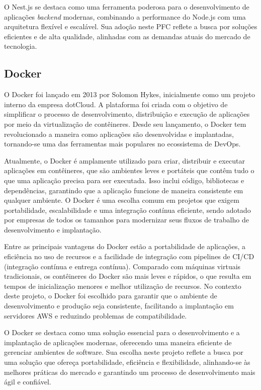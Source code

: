 O Nest.js se destaca como uma ferramenta poderosa para o desenvolvimento de aplicações \textit{backend} modernas, combinando a performance do Node.js com uma arquitetura flexível e escalável. Sua adoção neste \acrlong{PFC} reflete a busca por soluções eficientes e de alta qualidade, alinhadas com as demandas atuais do mercado de tecnologia.

\subsection{Docker}

O Docker foi lançado em 2013 por Solomon Hykes, inicialmente como um projeto interno da empresa dotCloud. A plataforma foi criada com o objetivo de simplificar o processo de desenvolvimento, distribuição e execução de aplicações por meio da virtualização de contêineres. Desde seu lançamento, o Docker tem revolucionado a maneira como aplicações são desenvolvidas e implantadas, tornando-se uma das ferramentas mais populares no ecossistema de DevOps.

Atualmente, o Docker é amplamente utilizado para criar, distribuir e executar aplicações em contêineres, que são ambientes leves e portáteis que contêm tudo o que uma aplicação precisa para ser executada. Isso inclui código, bibliotecas e dependências, garantindo que a aplicação funcione de maneira consistente em qualquer ambiente. O Docker é uma escolha comum em projetos que exigem portabilidade, escalabilidade e uma integração contínua eficiente, sendo adotado por empresas de todos os tamanhos para modernizar seus fluxos de trabalho de desenvolvimento e implantação.

Entre as principais vantagens do Docker estão a portabilidade de aplicações, a eficiência no uso de recursos e a facilidade de integração com pipelines de CI/CD (integração contínua e entrega contínua). Comparado com máquinas virtuais tradicionais, os contêineres do Docker são mais leves e rápidos, o que resulta em tempos de inicialização menores e melhor utilização de recursos. No contexto deste projeto, o Docker foi escolhido para garantir que o ambiente de desenvolvimento e produção seja consistente, facilitando a implantação em servidores AWS e reduzindo problemas de compatibilidade.

O Docker se destaca como uma solução essencial para o desenvolvimento e a implantação de aplicações modernas, oferecendo uma maneira eficiente de gerenciar ambientes de software. Sua escolha neste projeto reflete a busca por uma solução que ofereça portabilidade, eficiência e flexibilidade, alinhando-se às melhores práticas do mercado e garantindo um processo de desenvolvimento mais ágil e confiável.

